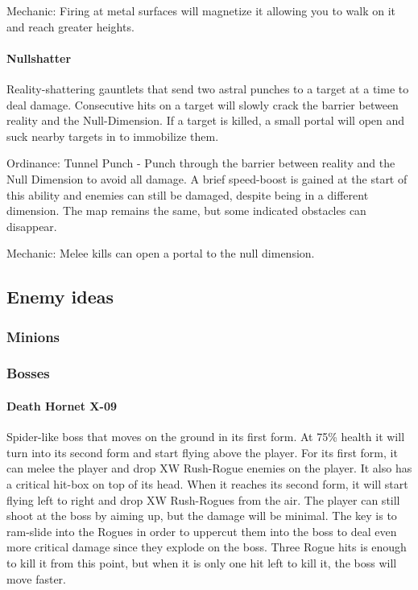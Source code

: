 \documentclass[../Main.tex]{subfiles}
\begin{document}
Mechanic: Firing at metal surfaces will magnetize it allowing you to walk on it and reach greater heights. 

\paragraph{Nullshatter}

Reality-shattering gauntlets that send two astral punches to a target at a time to deal damage. Consecutive hits on a target will slowly crack the barrier between reality and the Null-Dimension. If a target is killed, a small portal will open and suck nearby targets in to immobilize them.

Ordinance: Tunnel Punch - Punch through the barrier between reality and the Null Dimension to avoid all damage. A brief speed-boost is gained at the start of this ability and enemies can still be damaged, despite being in a different dimension. The map remains the same, but some indicated obstacles can disappear.

Mechanic: Melee kills can open a portal to the null dimension. 

\subsection{Enemy ideas}

\subsubsection{Minions}

\subsubsection{Bosses}

\paragraph{Death Hornet X-09}

Spider-like boss that moves on the ground in its first form. At 75\% health it will turn into its second form and start flying above the player. For its first form, it can melee the player and drop XW Rush-Rogue enemies on the player. It also has a critical hit-box on top of its head. When it reaches its second form, it will start flying left to right and drop XW Rush-Rogues from the air. The player can still shoot at the boss by aiming up, but the damage will be minimal. The key is to ram-slide into the Rogues in order to uppercut them into the boss to deal even more critical damage since they explode on the boss. Three Rogue hits is enough to kill it from this point, but when it is only one hit left to kill it, the boss will move faster. 
\end{document}
